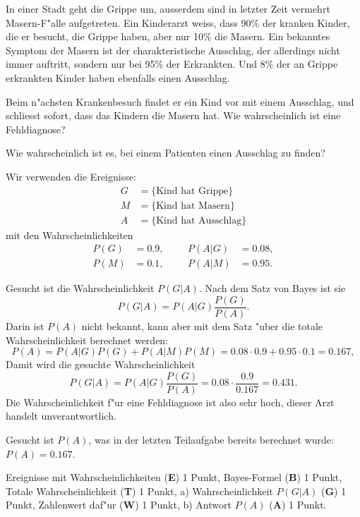 In einer Stadt geht die Grippe um, ausserdem sind in letzter Zeit
vermehrt Masern-F"alle aufgetreten.
Ein Kinderarzt weiss, dass 90\% der kranken Kinder, die er besucht,
die Grippe haben, aber nur 10\% die Masern.
Ein bekanntes Symptom der Masern ist der charakteristische Ausschlag,
der allerdings nicht immer auftritt, sondern nur bei 95\% der Erkrankten.
Und 8\% der an Grippe erkrankten Kinder haben ebenfalls einen Ausschlag.
\begin{teilaufgaben}
\item
Beim n"achsten Krankenbesuch findet er ein Kind vor mit einem Ausschlag,
und schliesst sofort, dass das Kindern die Masern hat.
Wie wahrscheinlich ist eine Fehldiagnose?
\item
Wie wahrscheinlich ist es, bei einem Patienten einen Ausschlag zu finden?
\end{teilaufgaben}

\begin{loesung}
Wir verwenden die Ereignisse:
\begin{align*}
G&=\{\text{Kind hat Grippe}\}\\
M&=\{\text{Kind hat Masern}\}\\
A&=\{\text{Kind hat Ausschlag}\}
\end{align*}
mit den Wahrscheinlichkeiten
\[
\begin{aligned}
P(G)&=0.9,&&&P(A|G)&=0.08,\\
P(M)&=0.1,&&&P(A|M)&=0.95.
\end{aligned}
\]
\begin{teilaufgaben}
\item
Gesucht ist die Wahrscheinlichkeit $P(G|A)$.
Nach dem Satz von Bayes ist sie
\[
P(G|A)=P(A|G)\frac{P(G)}{P(A)}.
\]
Darin ist $P(A)$ nicht bekannt, kann aber mit dem Satz "uber die totale
Wahrscheinlichkeit berechnet werden:
\[
P(A)=P(A|G)P(G)+P(A|M)P(M)=0.08\cdot 0.9 + 0.95\cdot 0.1=0.167,
\]
Damit wird die gesuchte Wahrscheinlichkeit
\[
P(G|A)=P(A|G)\frac{P(G)}{P(A)}=0.08\cdot\frac{0.9}{0.167}=0.431.
\]
Die Wahrscheinlichkeit f"ur eine Fehldiagnose ist also sehr hoch,
dieser Arzt handelt unverantwortlich.
\item Gesucht ist $P(A)$, was in der letzten Teilaufgabe bereits
berechnet wurde: $P(A)=0.167$.
\end{teilaufgaben}
\end{loesung}

\begin{bewertung}
Ereignisse mit Wahrscheinlichkeiten ({\bf E}) 1 Punkt,
Bayes-Formel ({\bf B}) 1 Punkt,
Totale Wahrscheinlichkeit ({\bf T}) 1 Punkt,
a) Wahrscheinlichkeit $P(G|A)$ ({\bf G}) 1 Punkt, 
Zahlenwert daf"ur ({\bf W}) 1 Punkt,
b) Antwort $P(A)$ ({\bf A}) 1 Punkt.
\end{bewertung}




